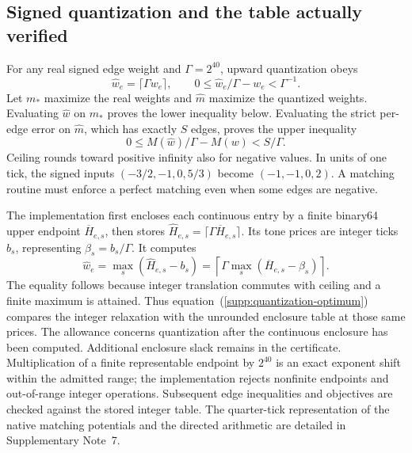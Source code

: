 \documentclass[10pt,letterpaper]{article}
\begin{document}
\subsection{Signed quantization and the table actually verified}
For any real signed edge weight and $\Gamma=2^{40}$, upward quantization obeys
\begin{equation}
 \widehat w_e=\lceil\Gamma w_e\rceil,
 \qquad 0\le\widehat w_e/\Gamma-w_e<\Gamma^{-1}.
 \label{supp:quantization}
\end{equation}
Let $m_*$ maximize the real weights and $\widehat m$ maximize the quantized weights. Evaluating $\widehat w$ on $m_*$ proves the lower inequality below. Evaluating the strict per-edge error on $\widehat m$, which has exactly $S$ edges, proves the upper inequality
\begin{equation}
 0\le M(\widehat w)/\Gamma-M(w)<S/\Gamma.
 \label{supp:quantization-optimum}
\end{equation}
Ceiling rounds toward positive infinity also for negative values. In units of one tick, the signed inputs $(-3/2,-1,0,5/3)$ become $(-1,-1,0,2)$. A matching routine must enforce a perfect matching even when some edges are negative.

The implementation first encloses each continuous entry by a finite binary64 upper endpoint $\overline H_{e,s}$, then stores $\widehat H_{e,s}=\lceil\Gamma\overline H_{e,s}\rceil$. Its tone prices are integer ticks $b_s$, representing $\beta_s=b_s/\Gamma$. It computes
\begin{equation}
 \widehat w_e=\max_s(\widehat H_{e,s}-b_s)
 =\left\lceil\Gamma\max_s(\overline H_{e,s}-\beta_s)\right\rceil.
 \label{supp:table-quantization}
\end{equation}
The equality follows because integer translation commutes with ceiling and a finite maximum is attained. Thus equation~(\ref{supp:quantization-optimum}) compares the integer relaxation with the unrounded enclosure table at those same prices. The allowance concerns quantization after the continuous enclosure has been computed. Additional enclosure slack remains in the certificate. Multiplication of a finite representable endpoint by $2^{40}$ is an exact exponent shift within the admitted range; the implementation rejects nonfinite endpoints and out-of-range integer operations. Subsequent edge inequalities and objectives are checked against the stored integer table. The quarter-tick representation of the native matching potentials and the directed arithmetic are detailed in Supplementary Note~7.
\end{document}
